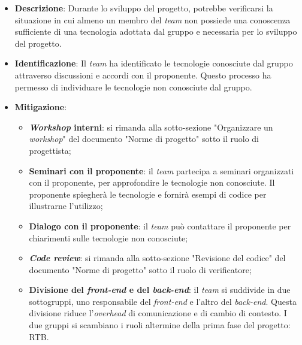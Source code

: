 \label{risk:conoscenza tecnologie carente}
\begin{itemize}
	\item \textbf{Descrizione}:
		Durante lo sviluppo del progetto, potrebbe verificarsi la situazione 
		in cui almeno un membro del \textit{team} non possiede una conoscenza 
		sufficiente di una tecnologia adottata dal gruppo e necessaria per 
		lo sviluppo del progetto.

	\item \textbf{Identificazione}: 
		Il \textit{team} ha identificato le tecnologie conosciute dal gruppo 
		attraverso discussioni e accordi con il proponente. 
		Questo processo ha permesso di individuare le tecnologie non conosciute dal gruppo.

	\item \textbf{Mitigazione}:
	      \begin{itemize}
		      \item \textbf{\textit{Workshop} interni}: si rimanda alla
		            sotto-sezione "Organizzare un \textit{workshop}" del
		            documento "Norme di progetto" sotto il ruolo di progettista;

		      \item \textbf{Seminari con il proponente}: il \textit{team}
		            partecipa a seminari organizzati con il proponente, per approfondire
		            le tecnologie non conosciute. 
					Il proponente spiegherà le tecnologie e fornirà esempi di codice
		            per illustrarne l'utilizzo;

		      \item \textbf{Dialogo con il proponente}: il \textit{team} può
		            contattare il proponente per chiarimenti sulle
		            tecnologie non conosciute;

		      \item \textbf{\textit{Code review}}: si rimanda alla sotto-sezione
		            "Revisione del codice" del documento "Norme di progetto"
		            sotto il ruolo di verificatore;

		      \item \textbf{Divisione del \textit{front-end} e del \textit{back-end}}: 
			  		il \textit{team} si suddivide in due sottogruppi, uno responsabile del 
					\textit{front-end} e l'altro del \textit{back-end}. 
					Questa divisione riduce l'\textit{overhead} di comunicazione e di cambio di
		            contesto. I due gruppi si scambiano i ruoli altermine della prima 
					fase del progetto: RTB.
	      \end{itemize}
\end{itemize}
